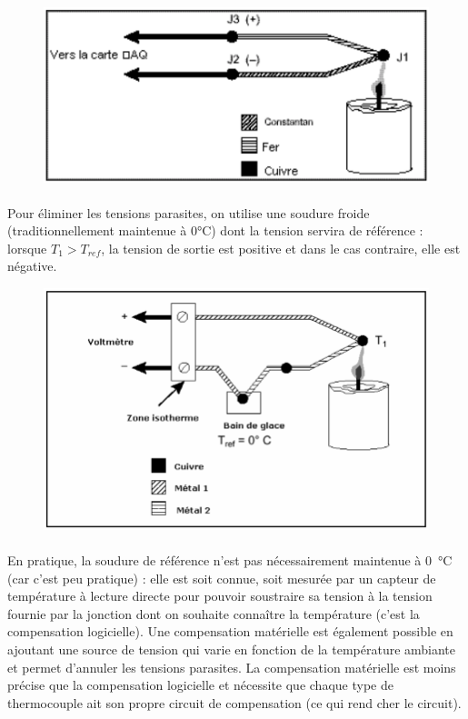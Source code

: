 \documentclass{article}
\begin{document}
\begin{figure}[H]
    \centering
    \includegraphics[width=0.6\linewidth]{./images/thermocouple1.png}
\end{figure}

\paragraph{}
Pour éliminer les tensions parasites, on utilise une soudure froide (traditionnellement maintenue à 0\si{\celsius}) dont la tension servira de référence : lorsque $T_1 > T_{ref}$, la tension de sortie est positive et dans le cas contraire, elle est négative.

\begin{figure}[H]
    \centering
    \includegraphics[width=0.6\linewidth]{./images/thermocouple2.png}
\end{figure}

\paragraph{}
En pratique, la soudure de référence n'est pas nécessairement maintenue à \SI{0}{\celsius} (car c'est peu pratique) : elle est soit connue, soit mesurée par un capteur de température à lecture directe pour pouvoir soustraire sa tension à la tension fournie par la jonction dont on souhaite connaître la température (c'est la compensation logicielle). Une compensation matérielle est également possible en ajoutant une source de tension qui varie en fonction de la température ambiante et permet d'annuler les tensions parasites. La compensation matérielle est moins précise que la compensation logicielle et nécessite que chaque type de thermocouple ait son propre circuit de compensation (ce qui rend cher le circuit).
\end{document}
